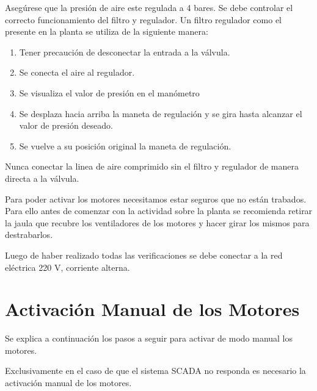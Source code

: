 \begin{tcolorbox}[title=Presión de aire]
  Asegúrese que la presión de aire este regulada a 4 bares. Se debe controlar 
  el correcto funcionamiento del filtro y regulador. 
 \tcblower
  Un filtro regulador como el presente en la planta se utiliza de la siguiente 
  manera: 
 \begin{enumerate}
    \item Tener precaución de desconectar la entrada a la válvula. 
    \item Se conecta el aire al regulador. 
    \item Se visualiza el valor de presión en el manómetro
    \item Se desplaza hacia arriba la maneta de regulación y se gira hasta 
      alcanzar el valor de presión deseado.
    \item Se vuelve a su posición original la maneta de regulación.
 \end{enumerate}
\end {tcolorbox}

\begin{lattention}
Nunca conectar la linea de aire comprimido sin el filtro y  
regulador de manera directa a la válvula.
\end{lattention}


\begin{tcolorbox}[title=Motores]
Para poder activar los motores necesitamos estar seguros que no están trabados.
 Para ello antes de comenzar con la actividad sobre la planta se recomienda 
retirar la jaula que recubre los ventiladores de los motores y hacer girar los 
mismos para destrabarlos.
\end {tcolorbox}


\begin{lattention}
Luego de haber realizado todas las verificaciones se debe conectar a la red 
eléctrica 220 V, corriente alterna.
\end{lattention}


 
 \section{Activación Manual de los Motores}
  Se explica a continuación los pasos a seguir para activar de modo manual los 
motores.
 \begin{lattention}
 Exclusivamente en el caso de que el sistema SCADA no responda 
 es necesario la activación manual de los motores.
\end{lattention}

